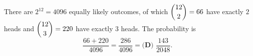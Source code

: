 There are $2^{12}=4096$ equally likely outcomes, of which $\dbinom{12}{2}=66$ have exactly $2$ heads and $\dbinom{12}{3}=220$ have exactly $3$ heads. The probability is
\[\dfrac{66+220}{4096}=\dfrac{286}{4096}=\boxed{\textbf{(D) }\dfrac{143}{2048}}.\]
